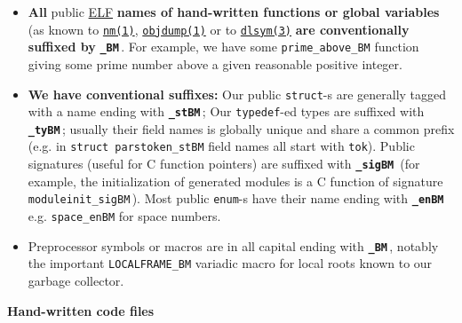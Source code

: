 \begin{itemize}

  \item \textbf{All} public
    \href{https://en.wikipedia.org/wiki/Executable_and_Linkable_Format}{ELF}
    \textbf{names of hand-written functions or global variables} (as
    known to
    \href{https://man7.org/linux/man-pages/man1/nm.1.html}{\texttt{nm(1)}},
    \href{https://man7.org/linux/man-pages/man1/objdump.1.html}{\texttt{objdump(1)}}
    or to
    \href{https://man7.org/linux/man-pages/man3/dlsym.3.html}{\texttt{dlsym(3)}}
    \textbf{are conventionally suffixed by}
           {\texttt{\textbf{\_BM}}}\,. For example, we have some
           \texttt{prime\_above\_BM} function giving some prime number
           above a given reasonable positive integer.

\item \textbf{We have conventional suffixes:} Our public
  \texttt{struct}-s are generally tagged with a name ending with
         {\texttt{\textbf{\_stBM}}}\,; Our \texttt{typedef}-ed types
         are suffixed with {\texttt{\textbf{\_tyBM}}}\,; usually their
         field names is globally unique and share a common prefix
         (e.g. in \texttt{struct parstoken\_stBM} field names all
         start with \texttt{tok}). Public signatures (useful for C
         function pointers) are suffixed with
         {\texttt{\textbf{\_sigBM}}}\, (for example, the
         initialization of generated modules is a C function of
         signature \texttt{moduleinit\_sigBM}\,). Most public
         \texttt{enum}-s have their name ending with
                {\texttt{\textbf{\_enBM}}}\, e.g. \texttt{space\_enBM}
                for space numbers.

              \item Preprocessor symbols or macros are in all capital
                ending with {\texttt{\textbf{\_BM}}}\,, notably the
                important \texttt{LOCALFRAME\_BM} variadic macro for
                local roots known to our garbage collector.
\end{itemize}

{\large \textbf{Hand-written  code files}}

